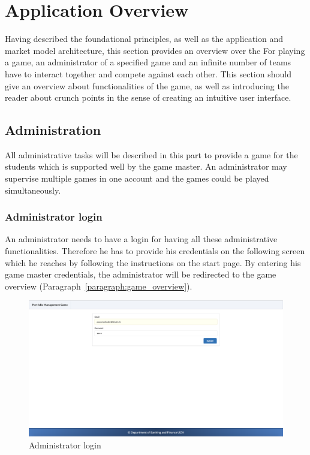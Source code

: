 \section{Application Overview}
\label{sec:application_overview}

Having described the foundational principles, as well as the application and market model architecture, this section provides an overview over the
For playing a game, an administrator of a specified game and an infinite number of teams have to interact together and compete against each other. This section should give an overview about functionalities of the game, as well as introducing the reader about crunch points in the sense of creating an intuitive user interface.

\subsection{Administration}
All administrative tasks will be described in this part to provide a game for the students which is supported well by the game master. An administrator may supervise multiple games in one account and the games could be played simultaneously.

\subsubsection{Administrator login}
An administrator needs to have a login for having all these administrative functionalities. Therefore he has to provide his credentials on the following screen which he reaches by following the instructions on the start page. By entering his game master credentials, the administrator will be redirected to the game overview (Paragraph~\ref{paragraph:game_overview}).
\begin{figure}[h!]
  \centering
  \includegraphics[scale=0.2]{img/application-overview/administrator/01_login.png}
  \caption{Administrator login}
\end{figure}

